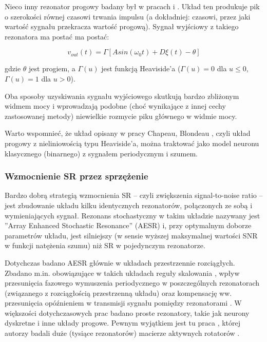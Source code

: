   Nieco inny rezonator progowy badany był w pracach \cite{blondeau_e53} i \cite{blondeau_e55}. Układ ten produkuje pik o szerokości równej czasowi trwania impulsu (a dokładniej: czasowi, przez jaki wartość sygnału przekracza wartość progową). Sygnał wyjściowy z takiego rezonatora ma postać ma postać:

  \begin{equation} \label{sr:gingl2}
    v_{out}(t) = \Gamma[A sin (\omega_0 t) + D \xi(t) - \theta]
  \end{equation}

  gdzie $\theta$ jest progiem, a $\Gamma(u)$ jest funkcją Heaviside'a ($\Gamma(u) = 0$ dla $u \leq 0$, $\Gamma(u) = 1$ dla $u > 0$).

  Oba sposoby uzyskiwania sygnału wyjściowego skutkują bardzo zbliżonym widmem mocy i wprowadzają podobne (choć wynikające z innej cechy zastosowanej metody) niewielkie rozmycie piku głównego w widmie mocy.

  Warto wspomnieć, że układ opisany w pracy Chapeau, Blondeau \cite{blondeau_e53}, czyli układ progowy z nieliniowością typu Heaviside'a, można traktować jako model neuronu klasycznego (binarnego) z sygnałem periodycznym i szumem.

  \subsubsection{Wzmocnienie SR przez sprzężenie}
  \label{sec:wzmocnienie_przez_sprzezenie}

  Bardzo dobrą strategią wzmocnienia SR -- czyli zwiększenia signal-to-noise ratio -- jest zbudowanie układu kilku identycznych rezonatorów, połączonych ze sobą i wymieniających sygnał. Rezonans stochastyczny w takim układzie nazywany jest ''Array Enhanced Stochastic Resonance'' (AESR) \cite{lindner_meadows} i, przy optymalnym doborze parametrów układu, jest silniejszy (w sensie wyższej maksymalnej wartości SNR w funkcji natężenia szumu) niż SR w pojedynczym rezonatorze.

  Dotychczas badano AESR głównie w układach przestrzennie rozciągłych. Zbadano m.in. obowiązujące w takich układach reguły skalowania \cite{lindner_meadows} \cite{tanabe_shimokawa}, wpływ przesunięcia fazowego wymuszenia periodycznego w poszczególnych rezonatorach (związanego z rozciągłością przestrzenną układu) \cite{ijmpb_14_8} oraz kompensację ww. przesunięcia opóźnieniem w transmisji sygnału pomiędzy rezonatorami \cite{ijmpb_23_2}. W większości dotychczasowych prac badano proste rezonatory, takie jak neurony dyskretne i inne układy progowe. Pewnym wyjątkiem jest tu praca \cite{tanabe_shimokawa}, której autorzy badali duże (tysiące rezonatorów) macierze aktywnych rotatorów \cite{wiesenfeld} \cite{pakdaman}.

